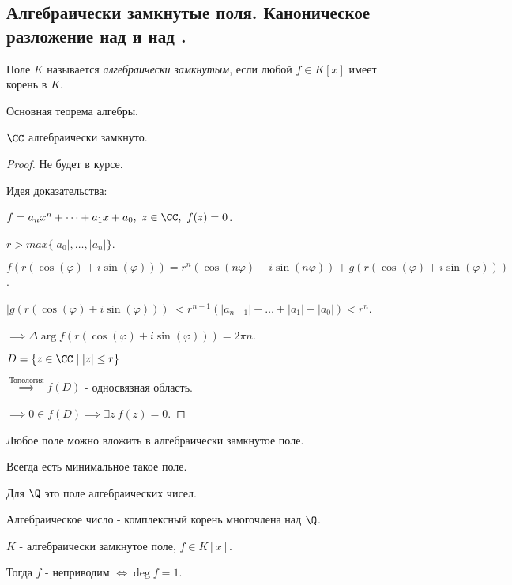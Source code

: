 \subsection{Алгебраически замкнутые поля. Каноническое разложение над \CC и над \R.}

\begin{defn}
    Поле $K$ называется \emph{алгебраически замкнутым}, если любой $f \in K[x]$ имеет корень в $K$.
\end{defn}

\begin{theorem}
    Основная теорема алгебры.

    $\CC$ алгебраически замкнуто.
\end{theorem}

\begin{proof}
     Не будет в курсе.

     Идея доказательства:

     $f = a_nx^n + \dots + a_1x + a_0,~ z \in \CC,~ f(z) = 0$.

     $r > max\{|a_0|, \ldots, |a_n|\}$.

     $f(r(\cos(\varphi) + i\sin(\varphi))) = r^n(\cos(n\varphi) + i\sin(n\varphi)) + g(r(\cos(\varphi) + i\sin(\varphi)))$.

     $|g(r(\cos(\varphi) + i\sin(\varphi)))| < r^{n - 1}(|a_{n - 1}| + \ldots + |a_1| + |a_0|) < r^n$.

     $\implies \Delta \arg f(r(\cos(\varphi) + i\sin(\varphi))) = 2\pi n$.

     $D = \{z \in \CC \mid |z| \le r\}$

     $\overset{\text{Топология}}{\implies} f(D)$ - односвязная область.

     $\implies 0 \in f(D) \implies \exists z~f(z) = 0$.
\end{proof}

\begin{notice} 
    Любое поле можно вложить в алгебраически замкнутое поле. 
    
    Всегда есть минимальное такое поле.

    Для $\Q$ это поле алгебраических чисел.

    Алгебраическое число - комплексный корень многочлена над $\Q$.
\end{notice}

\begin{theorem-non}
    $K$ - алгебраически замкнутое поле, $f \in K[x]$.

    Тогда $f$ - неприводим $\iff \deg f = 1$.
\end{theorem-non}

